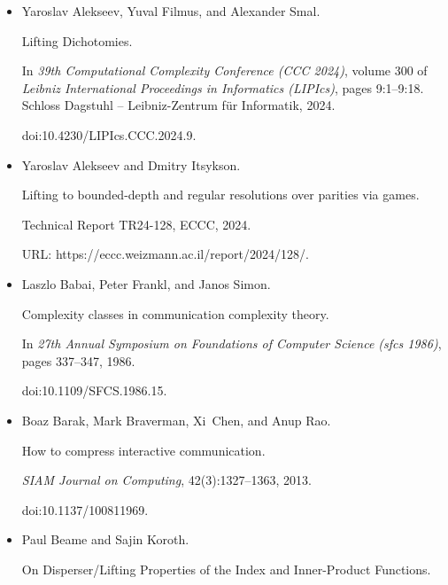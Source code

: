 \begin{itemize}


\item[] 
[1]

Yaroslav Alekseev, Yuval Filmus, and Alexander Smal.


Lifting Dichotomies.


In \emph{39th Computational Complexity Conference (CCC 2024)}, volume
300 of \emph{Leibniz International Proceedings in Informatics (LIPIcs)}, pages
9:1–9:18. Schloss Dagstuhl – Leibniz-Zentrum für Informatik, 2024.


doi:10.4230/LIPIcs.CCC.2024.9.





\item[] 
[2]

Yaroslav Alekseev and Dmitry Itsykson.


Lifting to bounded-depth and regular resolutions over parities via
games.


Technical Report TR24-128, ECCC, 2024.


URL: https://eccc.weizmann.ac.il/report/2024/128/.





\item[] 
[3]

Laszlo Babai, Peter Frankl, and Janos Simon.


Complexity classes in communication complexity theory.


In \emph{27th Annual Symposium on Foundations of Computer Science
(sfcs 1986)}, pages 337–347, 1986.


doi:10.1109/SFCS.1986.15.





\item[] 
[4]

Boaz Barak, Mark Braverman, Xi Chen, and Anup Rao.


How to compress interactive communication.


\emph{SIAM Journal on Computing}, 42(3):1327–1363, 2013.


doi:10.1137/100811969.





\item[] 
[5]

Paul Beame and Sajin Koroth.


On Disperser/Lifting Properties of the Index and Inner-Product
Functions.



\end{itemize}
